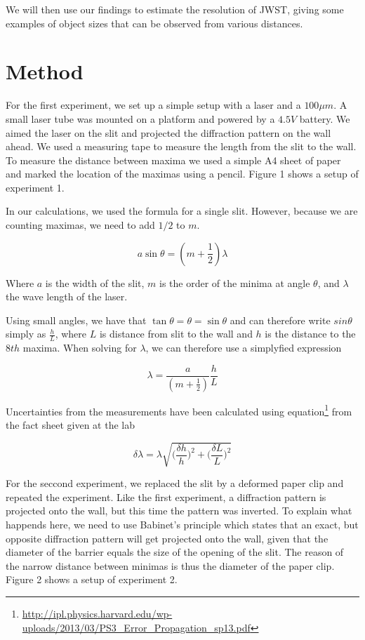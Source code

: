 \documentclass{emulateapj}
\begin{document}
We will then use our findings to estimate the resolution of JWST, giving some examples of object sizes that can be observed from various distances.

\section{Method}
\label{sec:method}

For the first experiment, we set up a simple setup with a laser and a $100 \mu m$. A small laser tube was mounted on a platform and powered by a $4.5V$ battery. We aimed the laser on the slit and projected the diffraction pattern on the wall ahead. We used a measuring tape to measure the length from the slit to the wall. To measure the distance between maxima we used a simple A4 sheet of paper and marked the location of the maximas using a pencil. Figure 1 shows a setup of experiment 1.

In our calculations, we used the formula for a single slit. However, because we are counting maximas, we need to add $1/2$ to $m$. 

\begin{equation}
a\sin{\theta} = (m+\frac{1}{2})\lambda
\end{equation}

Where $a$ is the width of the slit, $m$ is the order of the minima at angle $\theta$, and $\lambda$ the wave length of the laser.

Using small angles, we have that $\tan{\theta}=\theta=\sin{\theta}$ and can therefore write $sin{\theta}$ simply as $\frac{h}{L}$, where $L$ is distance from slit to the wall and $h$ is the distance to the $8th$ maxima. When solving for $\lambda$, we can therefore use a simplyfied expression

\begin{equation}
\lambda = \frac{a}{(m+\frac{1}{2})} \frac{h}{L}
\end{equation}

Uncertainties from the measurements have been calculated using equation\footnote{\url{http://ipl.physics.harvard.edu/wp-uploads/2013/03/PS3_Error_Propagation_sp13.pdf}} from the fact sheet given at the lab

\begin{equation}
\delta \lambda = \lambda \sqrt{\bigg (\frac{\delta h}{h}\bigg)^2 + \bigg (\frac{\delta L}{L}\bigg )^2}
\end{equation}


For the seccond experiment, we replaced the slit by a deformed paper clip and repeated the experiment. Like the first experiment, a diffraction pattern is projected onto the wall, but this time the pattern was inverted. To explain what happends here, we need to use Babinet's principle which states that an exact, but opposite diffraction pattern will get projected onto the wall, given that the diameter of the barrier equals the size of the opening of the slit. The reason of the narrow distance between minimas is thus the diameter of the paper clip. Figure 2 shows a setup of experiment 2.
\end{document}
